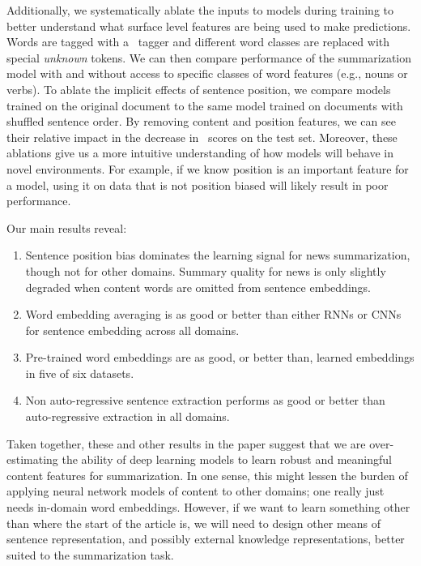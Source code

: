 Additionally, we systematically ablate the inputs to models during 
training to better understand what surface level features are being 
used to make predictions. Words are tagged with a \partofspeech~tagger
and different word classes are replaced with special \emph{unknown} tokens.
We can then compare performance of the summarization model with and without
access to specific classes of word features (e.g., nouns or verbs). To 
ablate the implicit effects of sentence position, we compare models
trained on the original document to the same model trained on documents
with shuffled sentence order. By removing content and position features,
we can see their relative impact in the decrease in \rouge~scores on the 
test set. Moreover, these ablations give us a more intuitive understanding
of how models will behave in novel environments. For example, if we know
position is an important feature for a model, using it on data that is
not position biased will likely result in poor performance.


Our main results  reveal:
\begin{enumerate}
 \item Sentence position bias dominates the learning signal for news summarization, though
not for other domains. Summary quality
for news is only slightly degraded when content words are omitted from sentence embeddings.
\item Word embedding averaging is as good or better than either RNNs or CNNs for sentence
embedding across all domains.
\item  Pre-trained word embeddings are as good, or
better than, learned embeddings in five of six
datasets.
\item Non auto-regressive sentence extraction performs as good or better than auto-regressive
extraction in all domains.
\end{enumerate}

Taken together, these and other results in the paper suggest that we are over-estimating the ability of deep learning models to learn robust and
meaningful content features for summarization. In
one sense, this might lessen the burden of applying neural network models of content to other domains; one really just needs in-domain word embeddings. However, if we want to learn something
other than where the start of the article is, we will
need to design other means of sentence representation, and possibly external knowledge representations, better suited to the summarization task.



